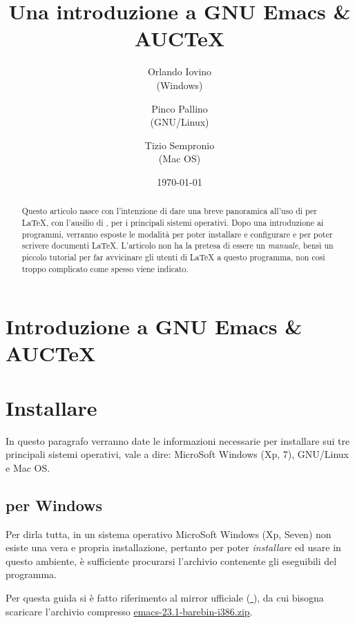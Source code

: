 \documentclass[10pt,a4paper]{article}
\title{Una introduzione a GNU Emacs \& AUC\TeX{}}
\author{Orlando Iovino\\(Windows)
  \and Pinco Pallino\\(GNU/Linux)
  \and Tizio Sempronio\\(Mac OS)}
\date{\today}
\begin{document}
 
\maketitle
\begin{abstract}\sffamily
\noindent Questo articolo nasce con l'intenzione di dare una breve panoramica
all'uso di \emacs{} per \LaTeX{}, con l'ausilio di \auctex, per i
principali sistemi operativi. Dopo una introduzione ai programmi,
verranno esposte le modalità per poter installare e configurare
\emacs{} e \auctex{} per poter scrivere     
documenti \LaTeX{}. L'articolo non ha la pretesa di essere un
\emph{manuale}, bensì un piccolo tutorial per far avvicinare gli 
utenti di \LaTeX{} a questo programma, non così troppo complicato 
come spesso viene indicato.
\end{abstract}

\begin{multicols}{2}
  \tableofcontents
\end{multicols}

\section{Introduzione a GNU Emacs \& AUC\TeX}
\label{sec:intro}

\textcolor{red!50}{\lipsum[1]}

\section{Installare \emacs}
\label{sec:install}

In questo paragrafo verranno date le informazioni necessarie per installare
\emacs{} sui tre principali sistemi operativi, vale a dire: 
\textsf{MicroSoft Windows (Xp, 7)},
\textsf{GNU/Linux} e %
\textsf{Mac OS}.  %

\subsection*{\emacs{} per Windows}
\label{sec:installwin}
Per dirla tutta, in un sistema operativo MicroSoft Windows (Xp, Seven)
non esiste una vera e propria installazione, pertanto per poter
\emph{installare} ed usare \emacs{} in questo ambiente,
è sufficiente procurarsi l'archivio contenente gli eseguibili del programma.

Per questa guida si è fatto riferimento al mirror ufficiale
(\href{http://ftp.gnu.org/pub/gnu/emacs/windows/}{\mano{} \emacs}),
da cui bisogna scaricare l'archivio compresso
\href{http://ftp.gnu.org/pub/gnu/emacs/windows/emacs-23.1-barebin-i386.zip}
{\textsf{emacs-23.1-barebin-i386.zip}}.
\end{document}
